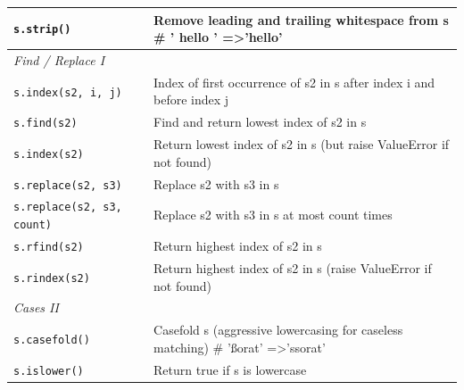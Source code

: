 \documentclass[a4paper,11pt]{book}
\begin{document}
\begin{appendices}
\begin{table}[!htbp]
\begin{tabular}{lp{11cm}}
\texttt{s.strip()                } & Remove leading and trailing whitespace from s \# ' hello ' =\textgreater 'hello'                                                                \\ \midrule
\textit{Find / Replace I}         &                                                                                                                                                 \\ \midrule
\texttt{s.index(s2, i, j)       } & Index of first occurrence of s2 in s after index i and before index j                                                                           \\
\texttt{s.find(s2)              } & Find and return lowest index of s2 in s                                                                                                         \\
\texttt{s.index(s2)            }  & Return lowest index of s2 in s (but raise ValueError if not found)                                                                              \\
\texttt{s.replace(s2, s3)     }   & Replace s2 with s3 in s                                                                                                                         \\
\texttt{s.replace(s2, s3, count)} & Replace s2 with s3 in s at most count times                                                                                                     \\
\texttt{s.rfind(s2)     }         & Return highest index of s2 in s                                                                                                                 \\
\texttt{s.rindex(s2)   }          & Return highest index of s2 in s (raise ValueError if not found)                                                                                 \\ \midrule
\textit{Cases II}                 &                                                                                                                                                 \\ \midrule
\texttt{s.casefold()  }           & Casefold s (aggressive lowercasing for caseless matching) \# 'ßorat' =\textgreater 'ssorat'                                                     \\
\texttt{s.islower()  }            & Return true if s is lowercase                                                                                                                   \\

\end{tabular}
\end{table}
\end{appendices}
\end{document}
